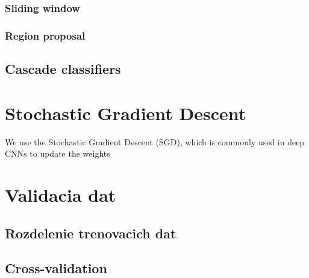\documentclass[10pt,a4paper]{article}
\begin{document}
\subsubsection{Sliding window}

\subsubsection{Region proposal}

\subsection{Cascade classifiers}



\section{Stochastic Gradient Descent}
We use the Stochastic Gradient Descent (SGD),
which is commonly used in deep CNNs to update the weights



\section{Validacia dat}

\subsection{Rozdelenie trenovacich dat}

\subsection{Cross-validation}
\end{document}
